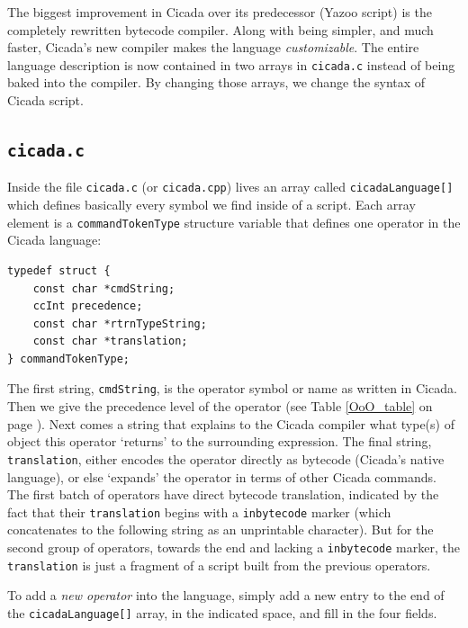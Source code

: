 \documentclass{article}
\newenvironment{code}{
       \begin{list}{}{
               \setlength{\leftmargin}{.4in}
               \setlength{\rightmargin}{0in}
               \setlength{\topsep}{.2in}
       }
       \small
       \item[] }
       { \end{list}   }
\begin{document}
The biggest improvement in Cicada over its predecessor (Yazoo script) is the completely rewritten bytecode compiler.  Along with being simpler, and much faster, Cicada's new compiler makes the language \emph{customizable}.  The entire language description is now contained in two arrays in \verb#cicada.c# instead of being baked into the compiler.  By changing those arrays, we change the syntax of Cicada script.



\subsection{\texttt{cicada.c}}

Inside the file \verb#cicada.c# (or \verb#cicada.cpp#) lives an array called \verb#cicadaLanguage[]# which defines basically every symbol we find inside of a script.  Each array element is a \verb#commandTokenType# structure variable that defines one operator in the Cicada language:

\begin{code} \begin{verbatim}
typedef struct {
    const char *cmdString;
    ccInt precedence;
    const char *rtrnTypeString;
    const char *translation;
} commandTokenType;
\end{verbatim} \end{code}

\noindent The first string, \verb#cmdString#, is the operator symbol or name as written in Cicada.  Then we give the precedence level of the operator (see Table \ref{OoO_table} on page \pageref{OoO_table}).  Next comes a string that explains to the Cicada compiler what type(s) of object this operator `returns' to the surrounding expression.  The final string, \verb#translation#, either encodes the operator directly as bytecode (Cicada's native language), or else `expands' the operator in terms of other Cicada commands.  The first batch of operators have direct bytecode translation, indicated by the fact that their \verb#translation# begins with a \verb#inbytecode# marker (which concatenates to the following string as an unprintable character).  But for the second group of operators, towards the end and lacking a \verb#inbytecode# marker, the \verb#translation# is just a fragment of a script built from the previous operators.

To add a \emph{new operator} into the language, simply add a new entry to the end of the \verb#cicadaLanguage[]# array, in the indicated space, and fill in the four fields.
\end{document}
